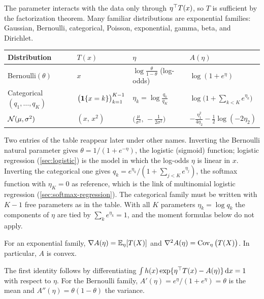 The parameter interacts with the data only through $\eta^{\top} T(x)$, so $T$ is sufficient by the factorization theorem. Many familiar distributions are exponential families: Gaussian, Bernoulli, categorical, Poisson, exponential, gamma, beta, and Dirichlet.

\begin{center}
\small
\begin{tabularx}{\textwidth}{@{}l>{\raggedright\arraybackslash}X>{\raggedright\arraybackslash}X>{\raggedright\arraybackslash}X@{}}
\toprule
Distribution & $T(x)$ & $\eta$ & $A(\eta)$ \\
\midrule
Bernoulli$(\theta)$ & $x$ & $\log\frac{\theta}{1-\theta}$ (log-odds) & $\log(1+e^\eta)$ \\
Categorical$(q_1,\dots,q_K)$ & $\big(\mathbf{1}\{x=k\}\big)_{k=1}^{K-1}$ & $\eta_k=\log\frac{q_k}{q_K}$ & $\log\big(1+\sum_{k<K}e^{\eta_k}\big)$ \\
$\mathcal{N}(\mu,\sigma^2)$ & $(x,\,x^2)$ & $\big(\frac{\mu}{\sigma^2},\,-\frac{1}{2\sigma^2}\big)$ & $-\frac{\eta_1^2}{4\eta_2}-\frac12\log(-2\eta_2)$ \\
\bottomrule
\end{tabularx}
\end{center}

Two entries of the table reappear later under other names. Inverting the Bernoulli natural parameter gives $\theta=1/(1+e^{-\eta})$, the logistic (sigmoid) function; logistic regression (\cref{sec:logistic}) is the model in which the log-odds $\eta$ is linear in $x$. Inverting the categorical one gives $q_k=e^{\eta_k}/(1+\sum_{j<K}e^{\eta_j})$, the softmax function with $\eta_K=0$ as reference, which is the link of multinomial logistic regression (\cref{sec:softmax-regression}). The categorical family must be written with $K-1$ free parameters as in the table. With all $K$ parameters $\eta_k=\log q_k$ the components of $\eta$ are tied by $\sum_ke^{\eta_k}=1$, and the moment formulas below do not apply.

\begin{proposition}\label{prop:expfam-moments}
For an exponential family, $\nabla A(\eta)=\mathbb{E}_\eta[T(X)]$ and $\nabla^2A(\eta)=\operatorname{Cov}_\eta\big(T(X)\big)$. In particular, $A$ is convex.
\end{proposition}

The first identity follows by differentiating $\int h(x)\exp\{\eta^{\top} T(x)-A(\eta)\}\,\mathrm{d} x=1$ with respect to $\eta$. For the Bernoulli family, $A'(\eta)=e^\eta/(1+e^\eta)=\theta$ is the mean and $A''(\eta)=\theta(1-\theta)$ the variance.


